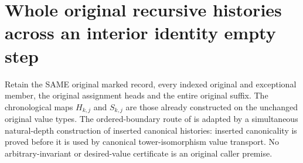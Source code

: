 \section{Whole original recursive histories across an interior identity empty step}

Retain the SAME original marked record, every indexed original and exceptional
member, the original assignment heads and the entire original suffix. The
chronological maps $H_{k,j}$ and $S_{k,j}$ are those already constructed on
the unchanged original value types. The ordered-boundary route of
\cite{wlodarczyk05-hironaka,bierstone-milman08-functoriality} is adapted by a
simultaneous natural-depth construction of inserted canonical histories:
inserted canonicality is proved before it is used by canonical tower-isomorphism
value transport. No arbitrary-invariant or desired-value certificate is an
original caller premise.

